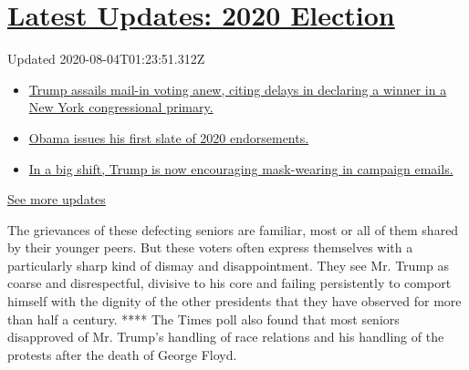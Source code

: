 \hypertarget{latest-updates-2020-election}{%
\section{\texorpdfstring{\href{https://www.nytimes.com/2020/08/03/us/elections/biden-vs-trump.html?action=click\&pgtype=Article\&state=default\&region=MAIN_CONTENT_1\&context=storylines_live_updates}{Latest
Updates: 2020
Election}}{Latest Updates: 2020 Election}}\label{latest-updates-2020-election}}

Updated 2020-08-04T01:23:51.312Z

\begin{itemize}
\tightlist
\item
  \href{https://www.nytimes.com/2020/08/03/us/elections/biden-vs-trump.html?action=click\&pgtype=Article\&state=default\&region=MAIN_CONTENT_1\&context=storylines_live_updates\#link-6494b448}{Trump
  assails mail-in voting anew, citing delays in declaring a winner in a
  New York congressional primary.}
\item
  \href{https://www.nytimes.com/2020/08/03/us/elections/biden-vs-trump.html?action=click\&pgtype=Article\&state=default\&region=MAIN_CONTENT_1\&context=storylines_live_updates\#link-3de249e6}{Obama
  issues his first slate of 2020 endorsements.}
\item
  \href{https://www.nytimes.com/2020/08/03/us/elections/biden-vs-trump.html?action=click\&pgtype=Article\&state=default\&region=MAIN_CONTENT_1\&context=storylines_live_updates\#link-54e34d20}{In
  a big shift, Trump is now encouraging mask-wearing in campaign
  emails.}
\end{itemize}

\href{https://www.nytimes.com/2020/08/03/us/elections/biden-vs-trump.html?action=click\&pgtype=Article\&state=default\&region=MAIN_CONTENT_1\&context=storylines_live_updates}{See
more updates}

The grievances of these defecting seniors are familiar, most or all of
them shared by their younger peers. But these voters often express
themselves with a particularly sharp kind of dismay and disappointment.
They see Mr. Trump as coarse and disrespectful, divisive to his core and
failing persistently to comport himself with the dignity of the other
presidents that they have observed for more than half a century. ****
The Times poll also found that most seniors disapproved of Mr. Trump's
handling of race relations and his handling of the protests after the
death of George Floyd.

